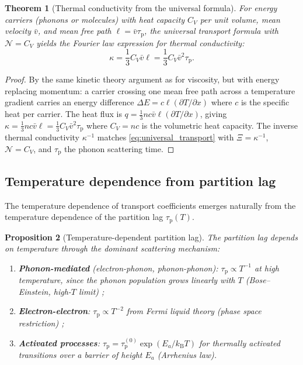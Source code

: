 \documentclass[twocolumn,10pt,a4paper]{article}
\newtheorem{theorem}{Theorem}[section]
\newtheorem{proposition}[theorem]{Proposition}
\theoremstyle{definition}
\theoremstyle{remark}
\newcommand{\kB}{k_{\mathrm{B}}}
\newcommand{\tauP}{\tau_{\mathrm{p}}}
\begin{document}
\begin{theorem}[Thermal conductivity from the universal formula]\label{thm:thermal}
For energy carriers (phonons or molecules) with heat capacity $C_V$ per unit volume, mean velocity $\bar{v}$, and mean free path $\ell = \bar{v}\tauP$, the universal transport formula with $\mathcal{N} = C_V$ yields the Fourier law \citep{Fourier1822} expression for thermal conductivity:
\begin{equation}\label{eq:thermal_cond}
\kappa = \frac{1}{3} C_V \bar{v} \ell = \frac{1}{3} C_V \bar{v}^2 \tauP.
\end{equation}
\end{theorem}

\begin{proof}
By the same kinetic theory argument as for viscosity, but with energy replacing momentum: a carrier crossing one mean free path across a temperature gradient carries an energy difference $\Delta E = c \ell (\partial T / \partial x)$ where $c$ is the specific heat per carrier. The heat flux is $q = \frac{1}{3} n c \bar{v} \ell (\partial T / \partial x)$, giving $\kappa = \frac{1}{3} n c \bar{v} \ell = \frac{1}{3} C_V \bar{v}^2 \tauP$ where $C_V = nc$ is the volumetric heat capacity. The inverse thermal conductivity $\kappa^{-1}$ matches \eqref{eq:universal_transport} with $\Xi = \kappa^{-1}$, $\mathcal{N} = C_V$, and $\tauP$ the phonon scattering time.
\end{proof}

\subsection{Temperature dependence from partition lag}

The temperature dependence of transport coefficients emerges naturally from the temperature dependence of the partition lag $\tauP(T)$.

\begin{proposition}[Temperature-dependent partition lag]\label{prop:tau_T}
The partition lag depends on temperature through the dominant scattering mechanism:
\begin{enumerate}[label=(\roman*)]
\item \textbf{Phonon-mediated} (electron-phonon, phonon-phonon): $\tauP \propto T^{-1}$ at high temperature, since the phonon population grows linearly with $T$ (Bose--Einstein, high-$T$ limit) \citep{Ziman1960};
\item \textbf{Electron-electron}: $\tauP \propto T^{-2}$ from Fermi liquid theory (phase space restriction) \citep{Ashcroft1976};
\item \textbf{Activated processes}: $\tauP = \tauP^{(0)} \exp(E_a / \kB T)$ for thermally activated transitions over a barrier of height $E_a$ (Arrhenius law).
\end{enumerate}
\end{proposition}
\end{document}
